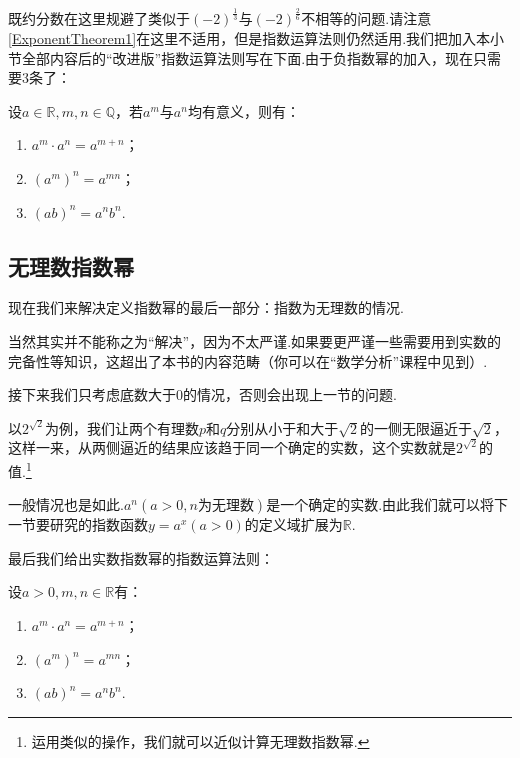 \documentclass[lang=cn,math=cm,chinesefont=nofont,11pt,scheme=chinese,twocol]{elegantbook}
\begin{document}
既约分数在这里规避了类似于$(-2)^\frac{1}{3}$与$(-2)^\frac{2}{6}$不相等的问题.请注意\ref{ExponentTheorem1}在这里不适用，但是指数运算法则仍然适用.我们把加入本小节全部内容后的“改进版”指数运算法则写在下面.由于负指数幂的加入，现在只需要3条了：

\begin{property}\label{LawOfIndices2}
  设$a\in\mathbb{R},m,n\in\mathbb{Q}$，若$a^m$与$a^n$均有意义，则有：
  \begin{enumerate}
    \item $a^m\cdot a^n=a^{m+n}$；
    \item $(a^m)^n=a^{mn}$；
    \item $(ab)^n=a^nb^n$.
    \end{enumerate}
\end{property}

\subsection{无理数指数幂}

现在我们来解决定义指数幂的最后一部分：指数为无理数的情况.

当然其实并不能称之为“解决”，因为不太严谨.如果要更严谨一些需要用到实数的完备性等知识，这超出了本书的内容范畴（你可以在“数学分析”课程中见到）.

接下来我们只考虑底数大于$0$的情况，否则会出现上一节的问题.

以$2^{\sqrt{2}}$为例，我们让两个有理数$p$和$q$分别从小于和大于$\sqrt{2}$的一侧无限逼近于$\sqrt{2}$，这样一来，从两侧逼近的结果应该趋于同一个确定的实数，这个实数就是$2^{\sqrt{2}}$的值.\footnote{运用类似的操作，我们就可以近似计算无理数指数幂.}

一般情况也是如此.$a^n(a>0,n\text{为无理数})$是一个确定的实数.由此我们就可以将下一节要研究的指数函数$y=a^x(a>0)$的定义域扩展为$\mathbb{R}$.

\hspace*{\fill}

最后我们给出实数指数幂的指数运算法则：

\begin{property}\label{LawOfIndices3}
  设$a>0,m,n\in\mathbb{R}$有：
  \begin{enumerate}
    \item $a^m\cdot a^n=a^{m+n}$；
    \item $(a^m)^n=a^{mn}$；
    \item $(ab)^n=a^nb^n$.
    \end{enumerate}
\end{property}
\end{document}
